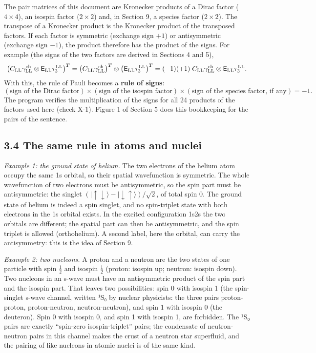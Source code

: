 \documentclass[
  10pt,
]{article}
\begin{document}
The pair matrices of this document are Kronecker products of a Dirac
factor (\(4\times4\)), an isospin factor (\(2\times2\)) and, in Section
9, a species factor (\(2\times2\)). The transpose of a Kronecker product
is the Kronecker product of the transposed factors. If each factor is
symmetric (exchange sign \(+1\)) or antisymmetric (exchange sign
\(-1\)), the product therefore has the product of the signs. For example
(the signs of the two factors are derived in Sections 4 and 5),
\[\big(C_{\rm LL}\gamma^{\rm ch}_{\rm LL}\otimes\mathsf E_{\rm LL}\tau^{\rm LL}_3\big)^T=\big(C_{\rm LL}\gamma^{\rm ch}_{\rm LL}\big)^T\otimes\big(\mathsf E_{\rm LL}\tau^{\rm LL}_3\big)^T=(-1)(+1)\;C_{\rm LL}\gamma^{\rm ch}_{\rm LL}\otimes\mathsf E_{\rm LL}\tau^{\rm LL}_3 .\]
With this, the rule of Pauli becomes a \textbf{rule of signs}:
\[(\text{sign of the Dirac factor})\times(\text{sign of the isospin factor})\times(\text{sign of the species factor, if any})=-1. \tag{3.2}\]
The program verifies the multiplication of the signs for all 24 products
of the factors used here (check X-1). Figure 1 of Section 5 does this
bookkeeping for the pairs of the sentence.

\hypertarget{the-same-rule-in-atoms-and-nuclei}{%
\subsection{3.4 The same rule in atoms and
nuclei}\label{the-same-rule-in-atoms-and-nuclei}}

\emph{Example 1: the ground state of helium.} The two electrons of the
helium atom occupy the same 1s orbital, so their spatial wavefunction is
symmetric. The whole wavefunction of two electrons must be
antisymmetric, so the spin part must be antisymmetric: the singlet
\((\lvert\uparrow\downarrow\rangle-\lvert\downarrow\uparrow\rangle)/\sqrt2\),
of total spin 0. The ground state of helium is indeed a spin singlet,
and no spin-triplet state with both electrons in the 1s orbital exists.
In the excited configuration 1s2s the two orbitals are different; the
spatial part can then be antisymmetric, and the spin triplet is allowed
(orthohelium). A second label, here the orbital, can carry the
antisymmetry: this is the idea of Section 9.

\emph{Example 2: two nucleons.} A proton and a neutron are the two
states of one particle with spin \(\tfrac12\) and isospin \(\tfrac12\)
(proton: isospin up; neutron: isospin down). Two nucleons in an s-wave
must have an antisymmetric product of the spin part and the isospin
part. That leaves two possibilities: spin 0 with isospin 1 (the
spin-singlet s-wave channel, written ¹S₀ by nuclear physicists: the
three pairs proton-proton, proton-neutron, neutron-neutron), and spin 1
with isospin 0 (the deuteron). Spin 0 with isospin 0, and spin 1 with
isospin 1, are forbidden. The ¹S₀ pairs are exactly ``spin-zero
isospin-triplet'' pairs; the condensate of neutron-neutron pairs in this
channel makes the crust of a neutron star superfluid, and the pairing of
like nucleons in atomic nuclei is of the same kind.
\end{document}
